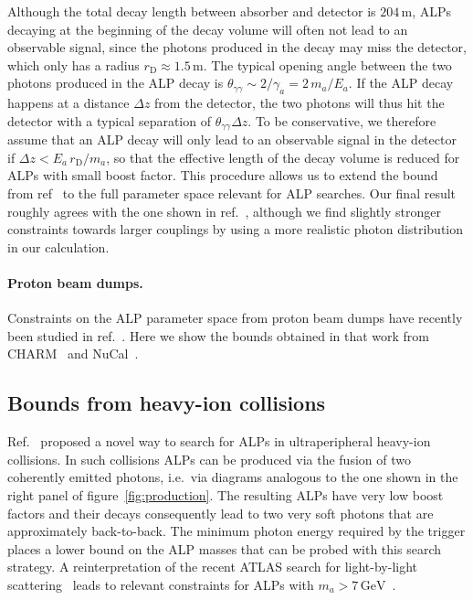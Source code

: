 \documentclass[11pt,a4paper]{article}
\begin{document}
Although the total decay length between absorber and detector is $204\,\mathrm{m}$, ALPs decaying at the beginning of the decay volume will often not lead to an observable signal, since the photons produced in the decay may miss the detector, which only has a radius $r_\mathrm{D} \approx 1.5\,\mathrm{m}$. The typical opening angle between the two photons produced in the ALP decay is $\theta_{\gamma\gamma} \sim 2 / \gamma_a = 2 \, m_a / E_a$. If the ALP decay happens at a distance $\Delta z$ from the detector, the two photons will thus hit the detector with a typical separation of $\theta_{\gamma\gamma} \Delta z$. To be conservative, we therefore assume that an ALP decay will only lead to an observable signal in the detector if $\Delta z < E_a \, r_\mathrm{D} / m_a$, so that the effective length of the decay volume is reduced for ALPs with small boost factor. This procedure allows us to extend the bound from ref~\cite{Bjorken:1988as} to the full parameter space relevant for ALP searches. Our final result roughly agrees with the one shown in ref.~\cite{Hewett:2012ns}, although we find slightly stronger constraints towards larger couplings by using a more realistic photon distribution in our calculation.

\paragraph{Proton beam dumps.}
Constraints on the ALP parameter space from proton beam dumps have recently been studied in ref.~\cite{Dobrich:2015jyk}. Here we show the bounds obtained in that work from CHARM~\cite{Bergsma:1985qz} and NuCal~\cite{Blumlein:1990ay,Blumlein:1991xh}.

\subsection{Bounds from heavy-ion collisions}

Ref.~\cite{Knapen:2016moh} proposed a novel way to search for ALPs in ultraperipheral heavy-ion collisions. In such collisions ALPs can be produced via the fusion of two coherently emitted photons, i.e.\ via diagrams analogous to the one shown in the right panel of figure~\ref{fig:production}. The resulting ALPs have very low boost factors and their decays consequently lead to two very soft photons that are approximately back-to-back. The minimum photon energy required by the trigger places a lower bound on the ALP masses that can be probed with this search strategy. A reinterpretation of the recent ATLAS search for light-by-light scattering~\cite{Aaboud:2017bwk} leads to relevant constraints for ALPs with $m_a > 7\,\mathrm{GeV}$~\cite{Knapen:2017ebd}.
\end{document}
